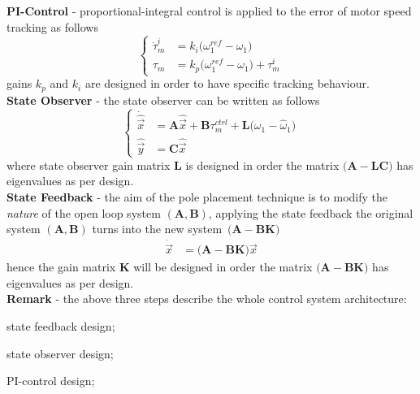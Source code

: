 \documentclass[12pt,a4paper]{scrartcl}
\begin{document}
\begin{onehalfspace}
\noindent\textbf{PI-Control} - proportional-integral control is applied to the error of motor speed tracking as follows
\begin{equation}\left\lbrace 
	\begin{aligned}
		\dot{\tau}_m^{i} &= k_i \big(\omega_1^{ref}-\omega_1\big) \\[6pt]
		{\tau}_m &= k_p \big(\omega_1^{ref}-\omega_1\big) + {\tau}_m^{i}
	\end{aligned}\right. 
\end{equation}
gains $k_p$ and $k_i$ are designed in order to have specific tracking behaviour. \\

\noindent\textbf{State Observer} - the state observer can be written as follows
\begin{equation}\left\lbrace 
	\begin{aligned}
		\dot{\hat{\vec{x}}} &= \mathbf{A}\hat{\vec{x}} + \mathbf{B}\tau_m^{ctrl} + \mathbf{L}\big(\omega_1 - \hat{\omega}_1\big) \\[6pt]
		\hat{\vec{y}} &= \mathbf{C}\hat{\vec{x}}
	\end{aligned}\right. 
\end{equation}
where state observer gain matrix $\mathbf{L}$ is designed in order the matrix $\Big(\mathbf{A} - \mathbf{L}\mathbf{C}\Big)$ has eigenvalues as per design. \\

\noindent\textbf{State Feedback} - the aim of the pole placement technique is to modify the \textit{nature} of the open loop system $(\mathbf{A},\mathbf{B})$, applying the state feedback the original system $(\mathbf{A},\mathbf{B})$ turns into the new system~$\big(\mathbf{A}-\mathbf{B}\mathbf{K}\big)$
\begin{equation}
	\begin{aligned}
		{\dot{\vec{x}}} &= \Big(\mathbf{A} - \mathbf{B}\mathbf{K}\Big)\vec{x}
	\end{aligned}
\end{equation}
hence the gain matrix $\mathbf{K}$ will be designed in order the matrix $\big(\mathbf{A} - \mathbf{B}\mathbf{K}\big)$
has eigenvalues as per design.  \\

\noindent\textbf{Remark} - the above three steps describe the whole control system architecture:
\begin{myitemize_1}
	\item[--] state feedback design;
	\item[--] state observer design;
	\item[--] PI-control design;
\end{myitemize_1}


\end{onehalfspace}
\end{document}
